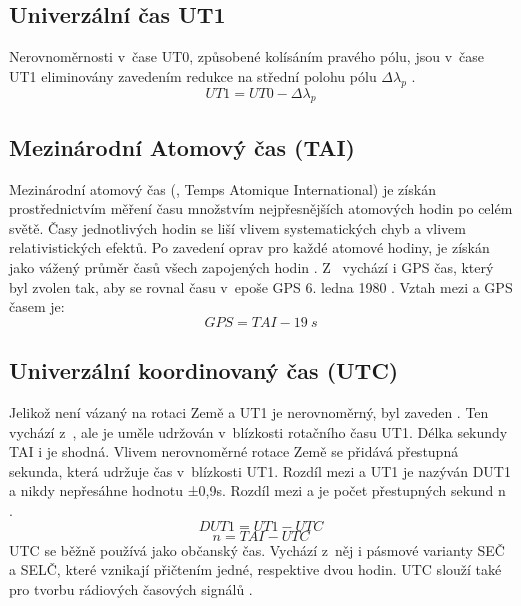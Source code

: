 \subsection{Univerzální čas UT1}
Nerovnoměrnosti v~čase UT0, způsobené kolísáním pravého pólu, jsou v~čase UT1 eliminovány zavedením redukce na střední polohu pólu \(\Delta\lambda_p\) \cite{kostelecky_geodeticka_astronomie}.
\begin{equation}
    UT1=UT0-\Delta\lambda_p
\end{equation}

\subsection{Mezinárodní Atomový čas (TAI)}
Mezinárodní atomový čas (, Temps Atomique International) je získán prostřednictvím měření času množstvím nejpřesnějších atomových hodin po celém světě. Časy jednotlivých hodin se liší vlivem systematických chyb a vlivem relativistic\-kých efektů. Po zavedení oprav pro každé atomové hodiny, je  získán jako vážený průměr časů všech zapojených hodin \cite{kostelecky_geodeticka_astronomie} \cite{fixel_geodeticka_astronomie}. Z~ vychází i GPS čas, který byl zvolen tak, aby se rovnal času  v~epoše GPS 6. ledna 1980 \cite{kostelecky_glob_poloh_sourad_syst_skripta}. Vztah mezi  a GPS časem je:
\begin{equation}
    GPS=TAI -19~s
\end{equation}

\subsection{Univerzální koordinovaný čas (UTC)}%
Jelikož  není vázaný na rotaci Země a UT1 je nerovnoměrný, byl zaveden . Ten vychází z~, ale je uměle udržován v~blízkosti rotačního času UT1. Délka sekundy TAI i  je shodná. Vlivem nerovnoměrné rotace Země se přidává přestupná sekunda, která udržuje čas  v~blízkosti UT1. Rozdíl mezi  a UT1 je nazýván DUT1 a nikdy nepřesáhne hodnotu ±0,9s. Rozdíl mezi  a  je počet přestupných sekund n \cite{kostelecky_geodeticka_astronomie}.
\begin{equation}
    DUT1=UT1-UTC
\end{equation}
\begin{equation}
    n = TAI - UTC
\end{equation}
UTC se běžně používá jako občanský čas. Vychází z~něj i pásmové varianty SEČ a SELČ, které vznikají přičtením jedné, respektive dvou hodin. UTC slouží také pro tvorbu rádiových časových signálů \cite{kostelecky_geodeticka_astronomie}.